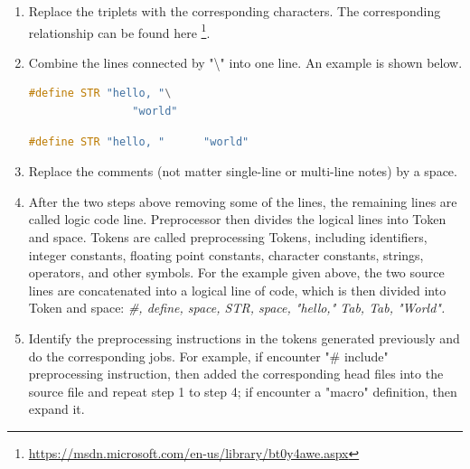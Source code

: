         \begin{enumerate}
            \item Replace the triplets with the corresponding characters. The corresponding relationship can be found here     \footnote{\url{https://msdn.microsoft.com/en-us/library/bt0y4awe.aspx}}. 
            
               
                    
            \item Combine the lines connected by "\textbackslash" into one line. An example is shown below.
            
                \begin{lstlisting}[language=c, caption= example 1 before]
             #define STR "hello, "\
	            "world"
                \end{lstlisting}
                 
                 \begin{lstlisting}[language=c, caption= example 1 after]
 #define STR "hello, "      "world"
                \end{lstlisting}
                
            
    
            \item Replace the comments (not matter single-line or multi-line notes) by a space.
    
     
            \item After the two steps above removing some of the lines, the remaining lines are called logic code line. Preprocessor then divides the logical lines into Token and space. Tokens are called preprocessing Tokens, including identifiers, integer constants, floating point constants, character constants, strings, operators, and other symbols.\newline 
            For the example given above, the two source lines are concatenated into a logical line of code, which is then divided into Token and space:\newline 
            \textit{\#, define, space, STR, space, "hello," Tab, Tab, "World".}
            
            \item  Identify the preprocessing instructions in the tokens generated previously and do the corresponding jobs. For example, if encounter "\# include" preprocessing instruction, then added the corresponding head files into the source file and repeat step 1 to step 4;  if  encounter a "macro"
            definition, then expand it.
            

\end{enumerate}
